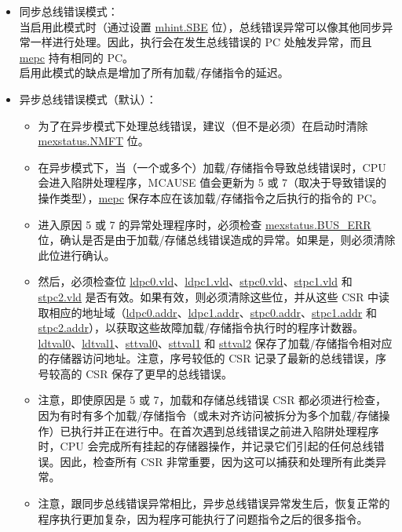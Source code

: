 \documentclass[main\_\_CN.tex]{subfiles}
\begin{document}
\begin{itemize}
    \item 同步总线错误模式： \\
    当启用此模式时（通过设置 \hyperref[fielddesc:MHINT_SBE]{mhint.SBE} 位），总线错误异常可以像其他同步异常一样进行处理。因此，执行会在发生总线错误的 PC 处触发异常，而且 \hyperref[regdesc:MEPC]{mepc} 持有相同的 PC。\\
    启用此模式的缺点是增加了所有加载/存储指令的延迟。
    \item 异步总线错误模式（默认）：
    \begin{itemize}
    \item 为了在异步模式下处理总线错误，建议（但不是必须）在启动时清除 \hyperref[fielddesc:MEXSTATUS_NMFT]{mexstatus.NMFT} 位。\\
    \item 在异步模式下，当（一个或多个）加载/存储指令导致总线错误时，CPU 会进入陷阱处理程序，MCAUSE 值会更新为 5 或 7（取决于导致错误的操作类型），\hyperref[regdesc:MEPC]{mepc} 保存本应在该加载/存储指令之后执行的指令的 PC。\\
    \item 进入原因 5 或 7 的异常处理程序时，必须检查 \hyperref[fielddesc:MEXSTATUS_BUS_ERR]{mexstatus.BUS\_ERR} 位，确认是否是由于加载/存储总线错误造成的异常。如果是，则必须清除此位进行确认。\\
    \item 然后，必须检查位 \hyperref[fielddesc:LDPC0_VLD]{ldpc0.vld}、\hyperref[fielddesc:LDPC1_VLD]{ldpc1.vld}、\hyperref[fielddesc:STPC0_VLD]{stpc0.vld}、\hyperref[fielddesc:STPC1_VLD]{stpc1.vld} 和 \hyperref[fielddesc:STPC2_VLD]{stpc2.vld} 是否有效。如果有效，则必须清除这些位，并从这些 CSR 中读取相应的地址域（\hyperref[fielddesc:LDPC0_ADDR]{ldpc0.addr}、\hyperref[fielddesc:LDPC1_ADDR]{ldpc1.addr}、\hyperref[fielddesc:STPC0_ADDR]{stpc0.addr}、\hyperref[fielddesc:STPC1_ADDR]{stpc1.addr} 和 \hyperref[fielddesc:STPC2_ADDR]{stpc2.addr}），以获取这些故障加载/存储指令执行时的程序计数器。\hyperref[regdesc:LDTVAL0]{ldtval0}、\hyperref[regdesc:LDTVAL1]{ldtval1}、\hyperref[regdesc:STTVAL0]{sttval0}、\hyperref[regdesc:STTVAL1]{sttval1} 和 \hyperref[regdesc:STTVAL2]{sttval2} 保存了加载/存储指令相对应的存储器访问地址。注意，序号较低的 CSR 记录了最新的总线错误，序号较高的 CSR 保存了更早的总线错误。\\
    \item 注意，即使原因是 5 或 7，加载和存储总线错误 CSR 都必须进行检查，因为有时有多个加载/存储指令（或未对齐访问被拆分为多个加载/存储操作）已执行并正在进行中。在首次遇到总线错误之前进入陷阱处理程序时，CPU 会完成所有挂起的存储器操作，并记录它们引起的任何总线错误。因此，检查所有 CSR 非常重要，因为这可以捕获和处理所有此类异常。\\
    \item 注意，跟同步总线错误异常相比，异步总线错误异常发生后，恢复正常的程序执行更加复杂，因为程序可能执行了问题指令之后的很多指令。
    \end{itemize}
\end{itemize}
\end{document}
